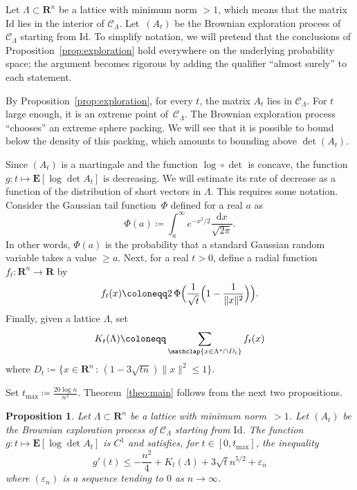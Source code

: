 \documentclass[12pt]{amsart}
\newcommand{\R}{\mathbf{R}}
\newcommand{\E}{\mathbf{E}}
\newcommand{\e}{\varepsilon}
\newcommand{\iy}{\infty}
\newcommand{\Id}{\mathrm{Id}}
\renewcommand{\leq}{\leqslant}
\renewcommand{\geq}{\geqslant}
\theoremstyle{plain}
\newtheorem{proposition}{Proposition}
\theoremstyle{remark}
\begin{document}
Let $\Lambda \subset \R^n$ be a lattice with minimum norm $>1$, which means that the matrix~$\Id$ lies in the interior of $\mathscr{C}_\Lambda$. Let~$(A_t)$ be the Brownian exploration process of $\mathscr{C}_\Lambda$ starting from $\Id$. To simplify notation, we will pretend that the conclusions of Proposition~\ref{prop:exploration} hold everywhere on the underlying probability space; the argument becomes rigorous by adding the qualifier ``almost surely'' to each statement.
 
By Proposition~\ref{prop:exploration}, for every $t$, the matrix $A_t$ lies in $\mathscr{C}_\Lambda$. For $t$ large enough, it is an extreme point of~$\mathscr{C}_\Lambda$. The Brownian exploration process ``chooses'' an extreme sphere packing. We will see that it is possible to bound below the density of this packing, which amounts to bounding above $\det(A_t)$.
 
Since $(A_t)$ is a martingale and the function $\log \circ \det$ is concave, the function $g \colon t \mapsto \E [ \log \det A_t ]$ is decreasing. We will estimate its rate of decrease as a function of the distribution of short vectors in $\Lambda$. This requires some notation. Consider the Gaussian tail function~$\Phi$ defined for a real $a$ as
\[ \Phi(a) \coloneqq \int_a ^{\iy} e^{-x^2/2} \frac{\mathrm{d}x}{\sqrt{2\pi}} .\]
In other words, $\Phi(a)$ is the probability that a standard Gaussian random variable takes a value $\geq a$. Next, for a real $t > 0$, define a radial function $f_t \colon  \R^n \to \R$ by
\[ f_t(x) \coloneqq 2 \, \Phi \Bigl(\frac{1}{\sqrt{t}}\Bigl(1 - \frac{1}{\|x\|^2}\Bigr) \Bigr).  \]
Finally, given a lattice $\Lambda$, set
\[ K_t(\Lambda) \coloneqq \sum_{\mathclap{x \in \Lambda^* \cap D_t}}  f_t(x) \]
where $D_t \coloneqq \{ x \in \R^n \, : \, (1-3\sqrt{tn})\|x\|^2 \leq 1 \}$.
 
Set $t_{\max} \coloneqq \frac{20 \log n}{n^2}$. Theorem~\ref{theo:main} follows from the next two propositions.
 
\begin{proposition} \label{prop1}
Let $\Lambda \subset \R^n$ be a lattice with minimum norm~$>1$. Let $(A_t)$ be the Brownian exploration process of $\mathscr{C}_\Lambda$ starting from $\Id$. The function $g \colon  t \mapsto \E [\log \det A_t]$ is $C^1$ and satisfies, for $t \in [0,t_{\max}]$, the inequality
\[ g'(t) \leq  - \frac{n^2}{4} + K_t(\Lambda) + 3 \sqrt{t} n^{5/2} + \e_n \]
where $(\e_n)$ is a sequence tending to $0$ as $n \to \infty$.
\end{proposition}
 
\end{document}
